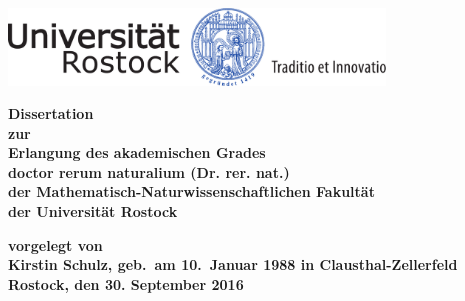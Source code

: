 
\thispagestyle{empty}
\begin{center}
\vspace*{-2cm}
\includegraphics[width=0.75\textwidth]{unilogo-siegel-farbe}\\
\vspace*{3cm}
    {\titlefont \huge \onehalfspacing
	\thetitle 
    \par}%
   \vfill
    {\normalfont\normalcolor\bfseries
	\large
	Dissertation \\
	\large
	zur\\
	Erlangung des akademischen Grades\\
	doctor rerum naturalium (Dr. rer. nat.)\\ 
	der Mathematisch-Naturwissenschaftlichen Fakultät\\
	der Universität Rostock
    \par}%
\end{center}\par
\vspace*{2.5cm}
\noindent\begin{minipage}[b]{\textwidth}
{\bf
  \noindent vorgelegt von\\
  Kirstin Schulz, geb.~am 10.~Januar 1988 in 
Clausthal-Zellerfeld\\



  \noindent Rostock, den 30. September 2016
  }
\end{minipage}


